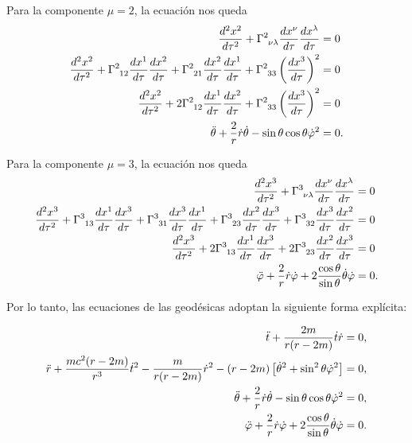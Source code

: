 \documentclass[letterpaper,11pt]{article}
\begin{document}
Para la componente $\mu = 2$, la ecuación nos queda\begin{align}
\frac{d^2 x^{2}}{d\tau^2} + \Gamma\indices{^2_{\nu \lambda}} \frac{dx^{\nu}}{d\tau} \frac{dx^{\lambda}}{d\tau} &= 0 \\
    \frac{d^2 x^{2}}{d\tau^2} +  \Gamma\indices{^2_{12}}  \frac{dx^{1}}{d\tau} \frac{dx^{2}}{d\tau} +  \Gamma\indices{^2_{21}}  \frac{dx^{2}}{d\tau} \frac{dx^{1}}{d\tau} + \Gamma\indices{^2_{33}} \left( \frac{dx^{3}}{d\tau} \right)^2  &= 0 \\
    \frac{d^2 x^{2}}{d\tau^2} +  2 \Gamma\indices{^2_{12}}  \frac{dx^{1}}{d\tau} \frac{dx^{2}}{d\tau} + \Gamma\indices{^2_{33}} \left( \frac{dx^{3}}{d\tau} \right)^2  &= 0 \\
\Ddot{\theta} + \frac{2}{r} \dot{r} \dot{\theta} - \sin\theta\cos\theta \dot{\varphi}^2 &= 0.
\end{align}

Para la componente $\mu = 3$, la ecuación nos queda\begin{align}
\frac{d^2 x^{3}}{d\tau^2} + \Gamma\indices{^3_{\nu \lambda}} \frac{dx^{\nu}}{d\tau} \frac{dx^{\lambda}}{d\tau} &= 0 \\
    \frac{d^2 x^{3}}{d\tau^2} +  \Gamma\indices{^3_{13}}  \frac{dx^{1}}{d\tau} \frac{dx^{3}}{d\tau} +   \Gamma\indices{^3_{31}}  \frac{dx^{3}}{d\tau} \frac{dx^{1}}{d\tau} + \Gamma\indices{^3_{23}}  \frac{dx^{2}}{d\tau} \frac{dx^{3}}{d\tau} + \Gamma\indices{^3_{32}}  \frac{dx^{3}}{d\tau} \frac{dx^{2}}{d\tau}  &= 0 \\
    \frac{d^2 x^{3}}{d\tau^2} +  2 \Gamma\indices{^3_{13}}  \frac{dx^{1}}{d\tau} \frac{dx^{3}}{d\tau}  + 2\Gamma\indices{^3_{23}}  \frac{dx^{2}}{d\tau} \frac{dx^{3}}{d\tau}   &= 0 \\
    \Ddot{\varphi} + \frac{2}{r} \dot{r}\dot{\varphi} + 2 \frac{\cos\theta}{\sin \theta} \dot{\theta} \dot{\varphi} &= 0.
\end{align}

Por lo tanto, las ecuaciones de las geodésicas adoptan la siguiente forma explícita:
\begin{shaded}
\begin{align}
\Ddot{t} +  \frac{2m}{r(r-2m)} \dot{t} \dot{r}&= 0, \label{eq:geod-time-1} \\    \Ddot{r} + \frac{mc^2(r-2m)}{r^3} \dot{t}^2 - \frac{m}{r(r-2m)} \dot{r}^2 - (r-2m) \left[\dot{\theta}^2 + \sin^2\theta \dot{\varphi}^2 \right]  &= 0, \label{eq:geod-time-2} \\
\Ddot{\theta} + \frac{2}{r} \dot{r} \dot{\theta} - \sin\theta\cos\theta \dot{\varphi}^2 &= 0, \label{eq:geod-time-3} \\
 \Ddot{\varphi} + \frac{2}{r} \dot{r}\dot{\varphi} + 2 \frac{\cos\theta}{\sin \theta} \dot{\theta} \dot{\varphi} &= 0. \label{eq:geod-time-4}
\end{align}
\end{shaded}
\end{document}
